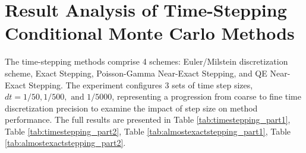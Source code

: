 \section{Result Analysis of Time-Stepping Conditional Monte Carlo Methods}

The time-stepping methods comprise 4 schemes: Euler/Milstein discretization scheme, Exact Stepping, Poisson-Gamma Near-Exact Stepping, and QE Near-Exact Stepping. The experiment configures 3 sets of time step sizes, $dt = 1/50, 1/500, \text{ and } 1/5000$, representing a progression from coarse to fine time discretization precision to examine the impact of step size on method performance. The full results are presented in Table \ref{tab:timestepping_part1}, Table \ref{tab:timestepping_part2}, Table \ref{tab:almostexactstepping_part1}, Table \ref{tab:almostexactstepping_part2}.

